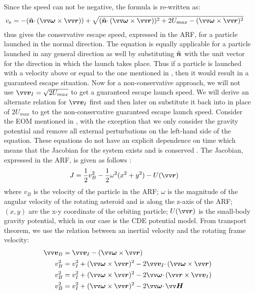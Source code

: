 Since the speed can not be negative, the formula is re-written as:
\begin{align}
    v_e &= -(\buv{n} \cdotp (\bv{\omega} \times \bv{r})) + \sqrt{(\buv{n} \cdotp (\bv{\omega} \times \bv{r}))^2 + 2U_{max} - (\bv{\omega} \times {\bv{r}})^2}
    \label{eqn:conservative_escape_speed}
\end{align}
 thus gives the conservative escape speed, expressed in the \gls{ARF}, for a particle launched in the normal direction. The equation is equally applicable for a particle launched in any general direction as well by substituting $\hat{\bm{n}}$ with the unit vector for the direction in which the launch takes place. Thus if a particle is launched with a velocity above or equal to the one mentioned in , then it would result in a guaranteed escape situation.
%
\newline\newline
%
Now for a non-conservative approach, we will not use $\bv{v}_I = \sqrt{2U_{max}}$ to get a guaranteed escape launch speed. We will derive an alternate relation for $\bv{v}_I$ first and then later on substitute it back into  in place of $2U_{max}$ to get the non-conservative guaranteed escape launch speed.
%
\newline\newline
%
Consider the \gls{EOM} mentioned in , with the exception that we only consider the gravity potential and remove all external perturbations on the left-hand side of the equation. These equations do not have an explicit dependence on time which means that the Jacobian for the system exists and is conserved \parencite{scheeresBook}. The Jacobian, expressed in the \gls{ARF}, is given as follows \parencite{scheeresBook}:
\begin{align}
    J &= \frac{1}{2} v_B^2 - \frac{1}{2} \omega^2(x^2 + y^2) - U(\bv{r})
    \label{eqn:jacobian}
\end{align}
where $v_B$ is the velocity of the particle in the \gls{ARF}; $\omega$ is the magnitude of the angular velocity of the rotating asteroid and is along the z-axis of the \gls{ARF}; $(x,y)$ are the x-y coordinate of the orbiting particle; $U(\bv{r})$ is the small-body gravity potential, which in our case is the \gls{CDE} potential model. From transport theorem, we use the relation between an inertial velocity and the rotating frame velocity:
\begin{align}
    \bv{v}_B &= \bv{v}_I - (\bv{\omega} \times \bv{r}) \\
    v_B^2 &= v_I^2 + (\bv{\omega} \times \bv{r})^2 - 2 \bv{v}_I \cdotp (\bv{\omega} \times \bv{r}) \\
    v_B^2 &= v_I^2 + (\bv{\omega} \times \bv{r})^2 - 2 \bv{\omega} \cdotp (\bv{r} \times \bv{v}_I) \\
    v_B^2 &= v_I^2 + (\bv{\omega} \times \bv{r})^2 - 2 \bv{\omega} \cdotp \bv{H}
    \label{eqn:arf_velocity_modified_with_H}
\end{align}
